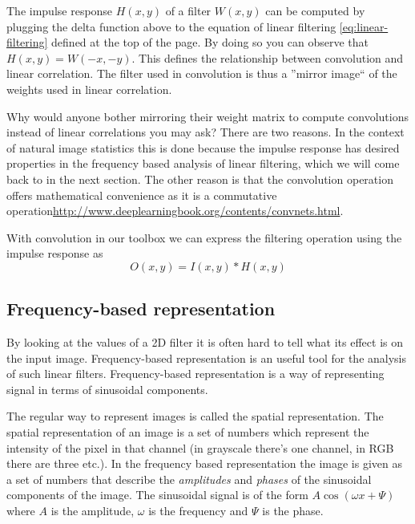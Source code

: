 \documentclass[]{article}
\begin{document}
The impulse response $H(x,y)$ of a filter $W(x,y)$ can be computed by plugging
the delta function above to the equation of linear filtering
\ref{eq:linear-filtering} defined at the top of the page. By doing so you can
observe that $H(x,y) = W(-x,-y)$. This defines the relationship between
convolution and linear correlation. The filter used in convolution is thus a
''mirror image`` of the weights used in linear correlation.

Why would anyone bother mirroring their weight matrix to compute convolutions
instead of linear correlations you may ask? There are two reasons. In the
context of natural image statistics this is done because the impulse response
has desired properties in the frequency based analysis of linear filtering,
which we will come back to in the next section. The other reason is that the
convolution operation offers mathematical convenience as it is a commutative
operation\url{http://www.deeplearningbook.org/contents/convnets.html}.

With convolution in our toolbox we can express the filtering operation using
the impulse response as
\begin{equation}
  O(x,y) = I(x,y) \ast H(x,y)
\end{equation}

\subsection{Frequency-based representation}
\label{frequency-based-representation}
By looking at the values of a 2D filter it is often hard to tell what its
effect is on the input image. Frequency-based representation is an useful tool
for the analysis of such linear filters. Frequency-based representation is a
way of representing signal in terms of sinusoidal components.

The regular way to represent images is called the spatial representation. The
spatial representation of an image is a set of numbers which represent the
intensity of the pixel in that channel (in grayscale there's one channel, in
RGB there are three etc.). In the frequency based representation the image is
given as a set of numbers that describe the \textit{amplitudes} and
\textit{phases} of the sinusoidal components of the image. The sinusoidal
signal is of the form $A \cos(\omega x + \Psi)$ where $A$ is the amplitude,
$\omega$ is the frequency and $\Psi$ is the phase.
\end{document}
